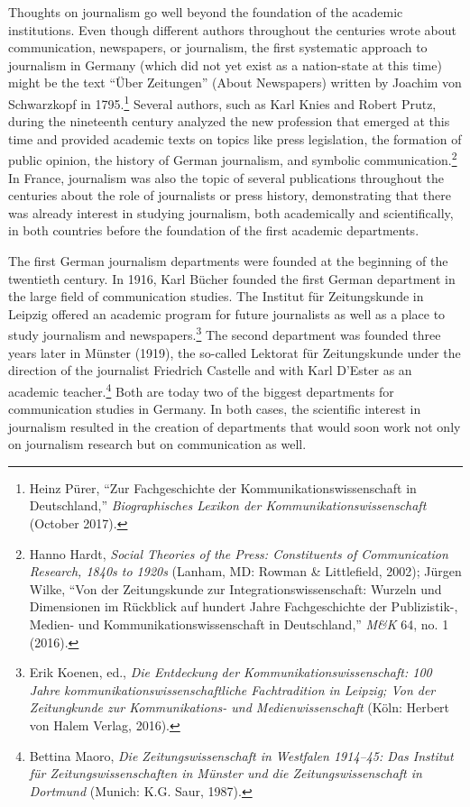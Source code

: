 \documentclass{tufte-handout}
\begin{document}
Thoughts on journalism go well beyond the foundation of the academic
institutions. Even though different authors throughout the centuries
wrote about communication, newspapers, or journalism, the first
systematic approach to journalism in Germany (which did not yet exist as
a nation-state at this time) might be the text ``Über Zeitungen'' (About
Newspapers) written by Joachim von Schwarzkopf in 1795.\footnote{Heinz
  Pürer, ``Zur Fachgeschichte der Kommunikationswissenschaft in
  Deutschland,'' \emph{Biographisches Lexikon der
  Kommunikationswissenschaft} (October 2017).} Several authors, such as
Karl Knies and Robert Prutz, during the nineteenth century analyzed the
new profession that emerged at this time and provided academic texts on
topics like press legislation, the formation of public opinion, the
history of German journalism, and symbolic communication.\footnote{Hanno
  Hardt, \emph{Social Theories of the Press: Constituents of
  Communication Research, 1840s to 1920s} (Lanham, MD: Rowman \&
  Littlefield, 2002); Jürgen Wilke, ``Von der Zeitungskunde zur
  Integrationswissenschaft: Wurzeln und Dimensionen im Rückblick auf
  hundert Jahre Fachgeschichte der Publizistik-, Medien- und
  Kommunikationswissenschaft in Deutschland,'' \emph{M\&K} 64, no. 1
  (2016).} In France, journalism was also the topic of several
publications throughout the centuries about the role of journalists or
press history, demonstrating that there was already interest in studying
journalism, both academically and scientifically, in both countries
before the foundation of the first academic departments.

The first German journalism departments were founded at the beginning of
the twentieth century. In 1916, Karl Bücher founded the first German
department in the large field of communication studies. The Institut für
Zeitungskunde in Leipzig offered an academic program for future
journalists as well as a place to study journalism and
newspapers.\footnote{Erik Koenen, ed., \emph{Die Entdeckung der
  Kommunikationswissenschaft: 100 Jahre kommunikationswissenschaftliche
  Fachtradition in Leipzig; Von der Zeitungkunde zur Kommunikations- und
  Medienwissenschaft} (Köln: Herbert von Halem Verlag, 2016).} The
second department was founded three years later in Münster (1919), the
so-called Lektorat für Zeitungskunde under the direction of the
journalist Friedrich Castelle and with Karl D'Ester as an academic
teacher.\footnote{Bettina Maoro, \emph{Die Zeitungswissenschaft in
  Westfalen 1914--45: Das Institut für Zeitungswissenschaften in Münster
  und die Zeitungswissenschaft in Dortmund} (Munich: K.G. Saur, 1987).}
Both are today two of the biggest departments for communication studies
in Germany. In both cases, the scientific interest in journalism
resulted in the creation of departments that would soon work not only on
journalism research but on communication as well.
\end{document}
